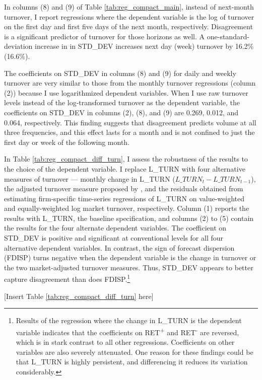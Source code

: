 \documentclass[
  12pt,
  a4paper,
  twoside,
  onecolumn]{article}
\begin{document}
In columns (8) and (9) of Table \ref{tab:reg_compact_main}, instead of
next-month turnover, I report regressions where the dependent variable
is the log of turnover on the first day and first five days of the next
month, respectively. Disagreement is a significant predictor of turnover
for those horizons as well. A one-standard-deviation increase in in
STD\_DEV increases next day (week) turnover by 16.2\% (16.6\%).

The coefficients on STD\_DEV in columns (8) and (9) for daily and weekly
turnover are very similar to those from the monthly turnover regressions
(column (2)) because I use logarithmized dependent variables. When I use
raw turnover levels instead of the log-transformed turnover as the
dependent variable, the coefficients on STD\_DEV in columns (2), (8),
and (9) are 0.269, 0.012, and 0.064, respectively. This finding suggests
that disagreement predicts volume at all three frequencies, and this
effect lasts for a month and is not confined to just the first day or
week of the following month.

In Table \ref{tab:reg_compact_diff_turn}, I assess the robustness of the
results to the choice of the dependent variable. I replace L\_TURN with
four alternative measures of turnover --- monthly change in L\_TURN
(\(L\_TURN_t - L\_TURN_{t-1}\)), the adjusted turnover measure proposed
by , and the residuals obtained from
estimating firm-specific time-series regressions of L\_TURN on
value-weighted and equally-weighted log market turnover, respectively.
Column (1) reports the results with L\_TURN, the baseline specification,
and columns (2) to (5) contain the results for the four alternate
dependent variables. The coefficient on STD\_DEV is positive and
significant at conventional levels for all four alternative dependent
variables. In contrast, the sign of forecast dispersion (FDISP) turns
negative when the dependent variable is the change in turnover or the
two market-adjusted turnover measures. Thus, STD\_DEV appears to better
capture disagreement than does FDISP.\footnote{Results of the regression
  where the change in L\_TURN is the dependent variable indicates that
  the coefficients on RET\textsuperscript{+} and RET\textsuperscript{-}
  are reversed, which is in stark contrast to all other regressions.
  Coefficients on other variables are also severely attenuated. One
  reason for these findings could be that L\_TURN is highly persistent,
  and differencing it reduces its variation considerably.}

\begin{center} { [Insert Table \ref{tab:reg_compact_diff_turn} here] } \end{center}
\end{document}
